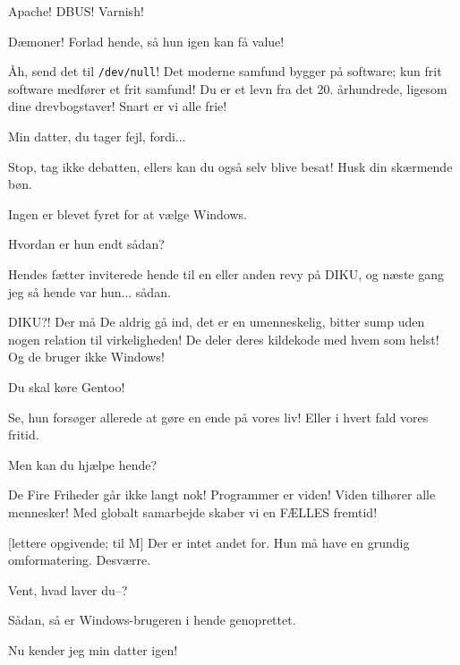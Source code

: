 \documentclass[a4paper,11pt]{article}
\begin{document}
\begin{sketch}
  Apache!  DBUS!  Varnish!

  Dæmoner!    Forlad hende, så hun igen kan få value!

   Åh, send det til
\texttt{/dev/null}!  Det moderne samfund bygger på software; kun frit
software medfører et frit samfund!  Du er et levn fra det
20. århundrede, ligesom dine drevbogstaver!  Snart er vi alle frie!

 Min datter, du tager fejl, fordi...

  Stop, tag ikke debatten, ellers kan du også
selv blive besat!  Husk din skærmende bøn.


 Ingen er blevet fyret for at vælge Windows.

 Hvordan er hun endt sådan?

 Hendes fætter inviterede hende til en eller anden revy på
DIKU, og næste gang jeg så hende var hun... sådan.

 DIKU?!  Der må De aldrig gå ind, det er en umenneskelig,
bitter sump uden nogen relation til virkeligheden!  De deler deres
kildekode med hvem som helst!  Og de bruger ikke Windows!

 Du skal køre Gentoo!

 Se, hun forsøger allerede at gøre en ende på vores liv!
Eller i hvert fald vores fritid.

 Men kan du hjælpe hende?

 De Fire Friheder går ikke langt nok!  Programmer er viden!
Viden tilhører alle mennesker!  Med globalt samarbejde skaber vi en
FÆLLES fremtid!

[lettere opgivende; til M] Der er intet andet for.  Hun må
have en grundig omformatering.     Desværre.  

 Vent, hvad laver du--?




 Sådan, så er Windows-brugeren i hende genoprettet. 

 Nu kender jeg min datter igen!



\end{sketch}
\end{document}
